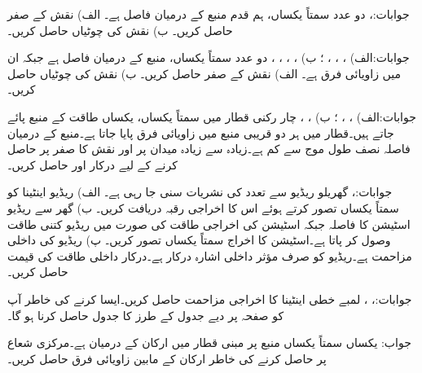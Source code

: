 جوابات:، 
دو عدد سمتاً یکساں، ہم قدم منبع کے درمیان فاصل  ہے۔ الف) نقش کے صفر حاصل کریں۔ ب) نقش کی چوٹیاں حاصل کریں۔

جوابات:الف) ، ، ، ؛ ب) ، ، ، ، 
دو عدد سمتاً یکساں، منبع کے درمیان فاصل  ہے جبکہ ان میں زاویائی فرق  ہے۔ الف) نقش کے صفر حاصل کریں۔ ب) نقش کی چوٹیاں حاصل کریں۔

جوابات:الف) ، ، ؛ ب) ، ، 
چار رکنی قطار میں سمتاً یکساں،  یکساں طاقت کے منبع پائے جاتے ہیں۔قطار میں ہر دو قریبی منبع میں  زاویائی فرق پایا جاتا ہے۔منبع کے درمیان فاصلہ نصف طول موج سے کم  ہے۔زیادہ سے زیادہ میدان  پر  اور نقش کا صفر  پر حاصل کرنے کے لیے درکار  اور  حاصل کریں۔ 

جوابات:، 
گھریلو ریڈیو سے  تعدد کی نشریات سنی جا رہی ہے۔ الف) ریڈیو اینٹینا کو سمتاً یکساں تصور کرتے ہوئے اس کا اخراجی رقبہ دریافت کریں۔ ب) گھر سے ریڈیو اسٹیشن کا فاصلہ  جبکہ اسٹیشن کی اخراجی طاقت  کی صورت میں ریڈیو کتنی طاقت وصول کر پاتا ہے۔اسٹیشن کا اخراج سمتاً یکساں تصور کریں۔ پ) ریڈیو کی داخلی مزاحمت  ہے۔ریڈیو کو صرف  مؤثر داخلی اشارہ درکار ہے۔درکار داخلی طاقت کی قیمت حاصل کریں۔  

جوابات:، ، 
 لمبے خطی اینٹینا کا اخراجی مزاحمت حاصل کریں۔ایسا کرنے کی خاطر آپ کو صفحہ  پر دیے جدول  کے طرز کا جدول حاصل کرنا ہو گا۔

جواب: 
یکساں سمتاً یکساں منبع پر مبنی قطار میں ارکان کے درمیان  ہے۔مرکزی شعاع  پر حاصل کرنے کی خاطر ارکان کے مابین زاویائی فرق  حاصل کریں۔ 

